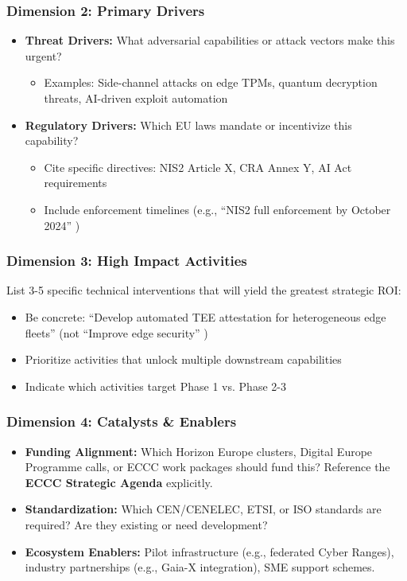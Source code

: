 \documentclass{ieeeaccess}
\begin{document}
\subsubsection*{Dimension 2: Primary Drivers}
\begin{itemize}
    \item \textbf{Threat Drivers:} What adversarial capabilities or attack vectors make this urgent?
    \begin{itemize}
        \item Examples: Side-channel attacks on edge TPMs, quantum decryption threats, AI-driven exploit automation
    \end{itemize}
    \item \textbf{Regulatory Drivers:} Which EU laws mandate or incentivize this capability?
    \begin{itemize}
        \item Cite specific directives: NIS2 Article X, CRA Annex Y, AI Act requirements
        \item Include enforcement timelines (e.g., ``NIS2 full enforcement by October 2024'' )
    \end{itemize}
\end{itemize}

\subsubsection*{Dimension 3: High Impact Activities}
List 3-5 specific technical interventions that will yield the greatest strategic ROI:
\begin{itemize}
    \item Be concrete: ``Develop automated TEE attestation for heterogeneous edge fleets''  (not ``Improve edge security'' )
    \item Prioritize activities that unlock multiple downstream capabilities
    \item Indicate which activities target Phase 1 vs. Phase 2-3
\end{itemize}

\subsubsection*{Dimension 4: Catalysts \& Enablers}
\begin{itemize}
    \item \textbf{Funding Alignment:} Which Horizon Europe clusters, Digital Europe Programme calls, or ECCC work packages should fund this? Reference the \textbf{ECCC Strategic Agenda} explicitly.
    \item \textbf{Standardization:} Which CEN/CENELEC, ETSI, or ISO standards are required? Are they existing or need development?
    \item \textbf{Ecosystem Enablers:} Pilot infrastructure (e.g., federated Cyber Ranges), industry partnerships (e.g., Gaia-X integration), SME support schemes.
\end{itemize}
\end{document}
